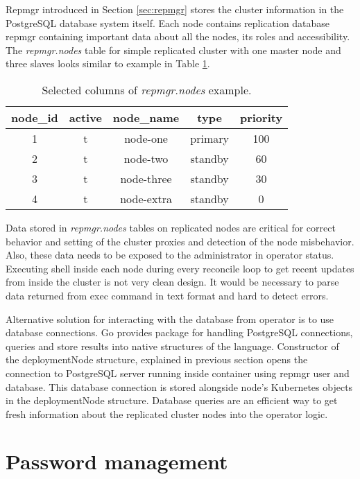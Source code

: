 \documentclass[
  digital, %
  twoside, %
  table,   %
  lof,     %
  lot,     %
]{fithesis3}
\begin{document}
Repmgr introduced in Section \ref{sec:repmgr} stores the cluster information in the PostgreSQL database system itself. Each node contains replication database repmgr containing important data about all the nodes, its roles and accessibility. The \textit{repmgr.nodes} table for simple replicated cluster with one master node and three slaves looks similar to example in Table \ref{table:repmgr_nodes}.

\begin{table}[ht!]
\centering
\begin{tabular}{|c c c c c|}
 \hline
 node\_id & active & node\_name & type & priority \\ [0.5ex]
 \hline
 1 & t & node-one & primary & 100 \\

 2 & t & node-two & standby & 60 \\

 3 & t & node-three & standby & 30 \\

 4 & t & node-extra & standby & 0 \\ [1ex]
 \hline
\end{tabular}
\caption{Selected columns of \textit{repmgr.nodes} example.}
\label{table:repmgr_nodes}
\end{table}

Data stored in \textit{repmgr.nodes} tables on replicated nodes are critical for correct behavior and setting of the cluster proxies and detection of the node misbehavior. Also, these data needs to be exposed to the administrator in operator status. Executing shell inside each node during every reconcile loop to get recent updates from inside the cluster is not very clean design. It would be necessary to parse data returned from exec command in text format and hard to detect errors.

Alternative solution for interacting with the database from operator is to use database connections. Go provides package for handling PostgreSQL connections, queries and store results into native structures of the language. Constructor of the deploymentNode structure, explained in previous section opens the connection to PostgreSQL server running inside container using repmgr user and database. This database connection is stored alongside node's Kubernetes objects in the deploymentNode structure. Database queries are an efficient way to get fresh information about the replicated cluster nodes into the operator logic.

\section{Password management}
\end{document}

